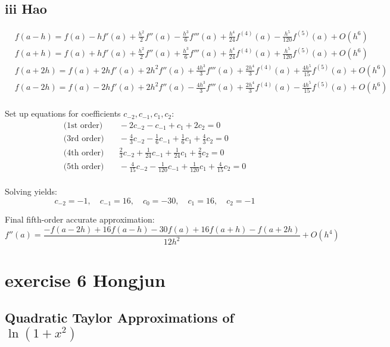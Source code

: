 \documentclass{article}
\begin{document}
\subsection{iii Hao}
\begin{align}
     & f(a-h) = f(a) - hf'(a) + \frac{h^2}{2}f''(a) - \frac{h^3}{6}f'''(a) + \frac{h^4}{24}f^{(4)}(a) - \frac{h^5}{120}f^{(5)}(a) + O(h^6) \\
     & f(a+h) = f(a) + hf'(a) + \frac{h^2}{2}f''(a) + \frac{h^3}{6}f'''(a) + \frac{h^4}{24}f^{(4)}(a) + \frac{h^5}{120}f^{(5)}(a) + O(h^6) \\
     & f(a+2h) = f(a) + 2hf'(a) + 2h^2f''(a) + \frac{4h^3}{3}f'''(a) + \frac{2h^4}{3}f^{(4)}(a) + \frac{4h^5}{15}f^{(5)}(a) + O(h^6)       \\
     & f(a-2h) = f(a) - 2hf'(a) + 2h^2f''(a) - \frac{4h^3}{3}f'''(a) + \frac{2h^4}{3}f^{(4)}(a) - \frac{4h^5}{15}f^{(5)}(a) + O(h^6)       \\
\end{align}

Set up equations for coefficients $c_{-2}, c_{-1}, c_1, c_2$:
\begin{align}
    \text{(1st order)} & \quad -2c_{-2} - c_{-1} + c_1 + 2c_2 = 0                                                 \\
    \text{(3rd order)} & \quad -\frac{4}{3}c_{-2} - \frac{1}{6}c_{-1} + \frac{1}{6}c_1 + \frac{4}{3}c_2 = 0       \\
    \text{(4th order)} & \quad \frac{2}{3}c_{-2} + \frac{1}{24}c_{-1} + \frac{1}{24}c_1 + \frac{2}{3}c_2 = 0      \\
    \text{(5th order)} & \quad -\frac{4}{15}c_{-2} - \frac{1}{120}c_{-1} + \frac{1}{120}c_1 + \frac{4}{15}c_2 = 0 \\
\end{align}


Solving yields:
\[
    c_{-2} = -1, \quad c_{-1} = 16, \quad c_0 = -30, \quad c_1 = 16, \quad c_2 = -1
\]

Final fifth-order accurate approximation:
\[
    f''(a) = \frac{-f(a-2h) + 16f(a-h) - 30f(a) + 16f(a+h) - f(a+2h)}{12h^2} + O(h^4)
\]

\section{exercise 6 Hongjun}
\subsection*{Quadratic Taylor Approximations of \(\ln(1+x^2)\)}
\end{document}
